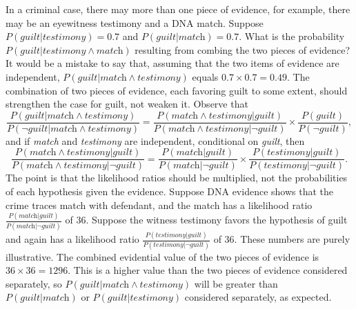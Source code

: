 \documentclass[10pt]{article}
\begin{document}
In a criminal case, there may more than one piece of evidence, for example, 
there may be an eyewitness testimony and a DNA match. 
Suppose $P(\textit{guilt}| \textit{testimony})=0.7$
and $P(\textit{guilt} | \textit{match})=0.7$. What is the probability 
$P(\textit{guilt}| \textit{testimony} \wedge \textit{match})$ resulting 
from combing the two pieces of evidence? It would be a mistake to say that, assuming that 
the two items of evidence are independent, $P(\textit{guilt}| \textit{match} \wedge \textit{testimony})$ equals 
$0.7\times 0.7=0.49$. %
The combination of two pieces of evidence, each favoring guilt to some extent, should strengthen the case for guilt, 
not weaken it. Observe that 
\[\frac{P(\textit{guilt} | \textit{match}\wedge \textit{testimony})}{P(\neg \textit{guilt} | \textit{match}\wedge \textit{testimony})}=\frac{P(\textit{match}\wedge \textit{testimony} | \textit{guilt})}{P(\textit{match}\wedge \textit{testimony} | \neg \textit{guilt})}\times \frac{P(\textit{guilt})}{P(\neg \textit{guilt})},\]
 and if \textit{match} and \textit{testimony} are independent, conditional on \textit{guilt}, then 
\[\frac{P(\textit{match}\wedge \textit{testimony} | \textit{guilt})}{P(\textit{match}\wedge \textit{testimony} | \neg \textit{guilt})}=\frac{P(\textit{match}| \textit{guilt})}{P(\textit{match}|\neg \textit{guilt})}\times\frac{P(\textit{testimony} | \textit{guilt})}{P(\textit{testimony} | \neg \textit{guilt})}.\]
%
%
%
The point is that the likelihood ratios should be multiplied, not the probabilities of each hypothesis given the evidence. 
Suppose DNA evidence shows that the crime traces match with defendant, and 
the match has a likelihood ratio $\frac{P(\textit{match} | \textit{guilt})}{P(\textit{match}| \neg \textit{guilt})}$ of 36. 
Suppose the witness testimony favors the hypothesis of guilt and again has a likelihood ratio $\frac{P(\textit{testimony} | \textit{guilt})}{P(\textit{testimony}| \neg \textit{guilt})}$ of 36.
These numbers are purely illustrative. The combined evidential value of the two pieces of evidence is $36\times 36=1296$. 
This is a higher value than the two pieces of evidence considered separately, so 
$P(\textit{guilt}| \textit{match} \wedge \textit{testimony})$ will be greater than $P(\textit{guilt}| \textit{match})$ 
or $P(\textit{guilt}| \textit{testimony})$ considered separately, as expected. 
 
\end{document}
